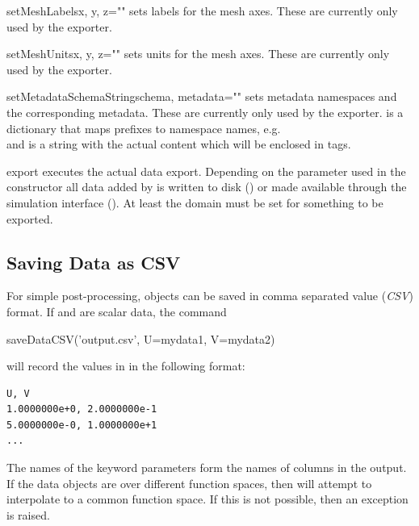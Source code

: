 \begin{methoddesc}[DataManager]{setMeshLabels}{x, y, z=""}
    sets labels for the mesh axes. These are currently only used by the \SILO
    exporter.
\end{methoddesc}

\begin{methoddesc}[DataManager]{setMeshUnits}{x, y, z=""}
    sets units for the mesh axes. These are currently only used by the \SILO
    exporter.
\end{methoddesc}

\begin{methoddesc}[DataManager]{setMetadataSchemaString}{schema, metadata=""}
    sets metadata namespaces and the corresponding metadata. These are
    currently only used by the \VTK exporter.
     is a dictionary that maps prefixes to namespace names, e.g.\\
     and  is a
    string with the actual content which will be enclosed in 
    tags.
\end{methoddesc}

\begin{methoddesc}[DataManager]{export}{}
    executes the actual data export. Depending on the  parameter
    used in the constructor all data added by  is written to
    disk () or made available through the \VisIt
    simulation interface ().
    At least the domain must be set for something to be exported.
\end{methoddesc}

\subsection{Saving Data as CSV}
\label{sec:savedatacsv}
For simple post-processing, \Data objects can be saved in comma separated
value (\emph{CSV}) format.
If  and  are scalar data, the command
\begin{python}
  saveDataCSV('output.csv', U=mydata1, V=mydata2)
\end{python}
will record the values in  in the following format:
\begin{verbatim}
U, V
1.0000000e+0, 2.0000000e-1
5.0000000e-0, 1.0000000e+1
...
\end{verbatim}

The names of the keyword parameters form the names of columns in the output.
If the data objects are over different function spaces, then 
will attempt to interpolate to a common function space.
If this is not possible, then an exception is raised.

